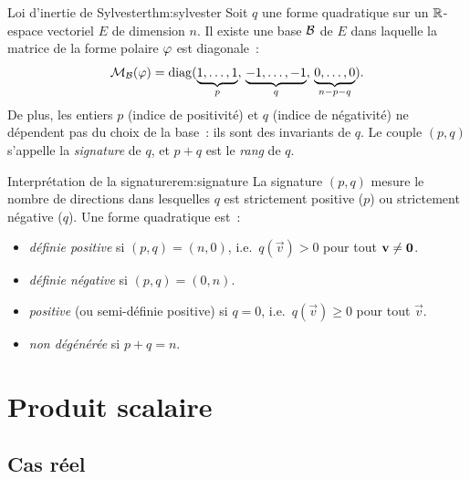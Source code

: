 \begin{theorem}{Loi d'inertie de Sylvester}{thm:sylvester}
  Soit $q$ une forme quadratique sur un ${\mathbb{R}}$-espace vectoriel $E$ de
  dimension $n$. Il existe une base ${\mathcal{B}}$ de $E$ dans laquelle la
  matrice de la forme polaire $\varphi$ est diagonale~:
  \[
    \mathcal{M}_{\mathcal{B}}(\varphi)=\operatorname{diag}(\underbrace{1,\ldots,1}_{p},\,
    \underbrace{-1,\ldots,-1}_{q},\,
    \underbrace{0,\ldots,0}_{n-p-q}).
  \]
  De plus, les entiers $p$ (indice de positivité) et $q$ (indice de
  négativité) ne dépendent pas du choix de la base~: ils sont des
  invariants de $q$. Le couple $(p,q)$ s'appelle la
  \emph{signature} de $q$, et $p+q$ est le
  \emph{rang} de $q$.
\end{theorem}

\begin{remark}{Interprétation de la signature}{rem:signature}
  La signature $(p,q)$ mesure le nombre de directions dans lesquelles $q$
  est strictement positive ($p$) ou strictement négative ($q$). Une forme
  quadratique est~:
  \begin{itemize}
    \item \emph{définie positive}
      si $(p,q)=(n,0)$, i.e.\ $q(\vec{v})>0$ pour tout
      $\mathbf{v}\neq\mathbf{0}$.
    \item \emph{définie négative} si $(p,q)=(0,n)$.
    \item \emph{positive} (ou semi-définie positive) si $q=0$, i.e.\
      $q(\vec{v})\geq 0$ pour tout $\vec{v}$.
    \item \emph{non dégénérée}
      si $p+q=n$.
  \end{itemize}
\end{remark}

\section{Produit scalaire}\label{sec:produit-scalaire}

\subsection{Cas réel}\label{subsec:ps-reel}

